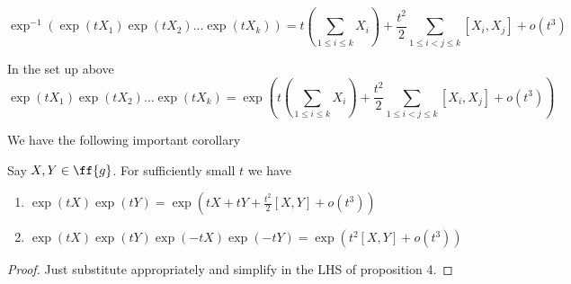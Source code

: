 \documentclass{article}
\begin{document}
$$\exp^{-1}(\exp(tX_1)\exp(tX_2)...\exp(tX_k)) = t(\sum_{1\leq i\leq k}X_i) + \frac{t^2}{2} \sum_{1\leq i<j\leq k}[X_i,X_j]+o(t^3)$$

\begin{proposition}
    In the set up above
    $$\exp(tX_1)\exp(tX_2)...\exp(tX_k) = \exp\left(t(\sum_{1\leq i\leq k}X_i) + \frac{t^2}{2} \sum_{1\leq i<j\leq k}[X_i,X_j]+o(t^3)\right)$$
\end{proposition}

We have the following important corollary

\begin{lemma}
    Say $X,Y\in\ff{g}$. For sufficiently small $t$ we have 
    \begin{enumerate}
        \item $\exp(tX)\exp(tY) = \exp(tX + tY + \frac{t^2}{2}[X,Y] + o(t^3))$
        \item $\exp(tX)\exp(tY)\exp(-tX)\exp(-tY) = \exp(t^2[X,Y]+o(t^3))$
    \end{enumerate}
\end{lemma}
\begin{proof}
    Just substitute appropriately and simplify in the LHS of proposition 4.
\end{proof}
\end{document}
